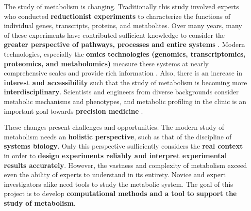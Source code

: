 The study of metabolism is changing.
Traditionally this study involved experts who conducted \textbf{reductionist experiments} to characterize the functions of individual genes, transcripts, proteins, and metabolites.
Over many years, many of these experiments have contributed sufficient knowledge to consider the \textbf{greater perspective of pathways, processes and entire systems} \supercite{wang_systems_2015}.
Modern technologies, especially the \textbf{omics technologies (genomics, transcriptomics, proteomics, and metabolomics)} measure these systems at nearly comprehensive scales and provide rich information \supercite{zhang_forward_2015}.
Also, there is an increase in \textbf{interest and accessibility} such that the study of metabolism is becoming more \textbf{interdisciplinary}.
Scientists and engineers from diverse backgrounds consider metabolic mechanisms and phenotypes, and metabolic profiling in the clinic is an important goal towards \textbf{precision medicine} \supercite{beebe_sharpening_2016, benson_clinical_2016, tebani_omics-based_2016, collins_new_2015, wang_systems_2015, zhang_forward_2015, topol_individualized_2014}.


These changes present challenges and opportunities.
The modern study of metabolism needs an \textbf{holistic perspective}, such as that of the discipline of \textbf{systems biology}.
Only this perspective sufficiently considers the \textbf{real context} in order to \textbf{design experiments reliably and interpret experimental results accurately}.
However, the vastness and complexity of metabolism exceed even the ability of experts to understand in its entirety.
Novice and expert investigators alike need tools to study the metabolic system.
The goal of this project is to develop \textbf{computational methods and a tool to support the study of metabolism}.
